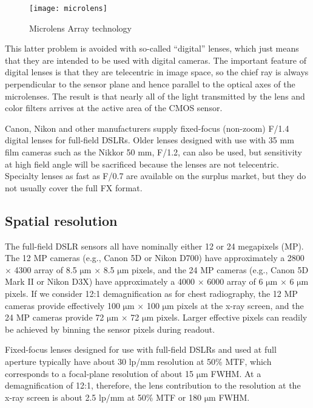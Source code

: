 \begin{figure}[h]
\centering
\texttt{[image: microlens]}
\caption{Microlens Array technology~\citep{microlensfig}}
\label{fig:microlensarray}
\end{figure}

This latter problem is avoided with so-called ``digital'' lenses, which just means that they are intended to be used with digital cameras. The important feature of digital lenses is that they are telecentric in image space, so the chief ray is always perpendicular to the sensor plane and hence parallel to the optical axes of the microlenses. The result is that nearly all of the light transmitted by the lens and color filters arrives at the active area of the CMOS sensor. 

Canon, Nikon and other manufacturers supply fixed-focus (non-zoom) F/1.4 digital lenses for full-field DSLRs. Older lenses designed with use with 35 mm film cameras such as the Nikkor 50 mm, F/1.2, can also be used, but sensitivity at high field angle will be sacrificed because the lenses are not telecentric. Specialty lenses as fast as F/0.7 are available on the surplus market, but they do not usually cover the full FX format.

\subsection{Spatial resolution}
\label{subsect:spatial_resolution}
The full-field DSLR sensors all have nominally either 12 or 24 megapixels (MP). The 12 MP cameras (e.g., Canon 5D or Nikon D700) have approximately a 2800 $\times$ 4300 array of 8.5 $\mathrm{\mu m}$ $\times$ 8.5 $\mathrm{\mu m}$ pixels, and the 24 MP cameras (e.g., Canon 5D Mark II or Nikon D3X) have approximately a 4000 $\times$ 6000 array of 6 $\mathrm{\mu m}$ $\times$ 6 $\mathrm{\mu m}$ pixels. If we consider 12:1 demagnification as for chest radiography, the 12 MP cameras provide effectively 100 $\mathrm{\mu m}$ $\times$ 100 $\mathrm{\mu m}$ pixels at the x-ray screen, and the 24 MP cameras provide 72 $\mathrm{\mu m}$ $\times$ 72 $\mathrm{\mu m}$ pixels. Larger effective pixels can readily be achieved by binning the sensor pixels during readout.

Fixed-focus lenses designed for use with full-field DSLRs and used at full aperture typically have about 30 lp/mm resolution at 50\% MTF, which corresponds to a focal-plane resolution of about 15 $\mathrm{\mu m}$ FWHM. At a demagnification of 12:1, therefore, the lens contribution to the resolution at the x-ray screen is about 2.5 lp/mm at 50\% MTF or 180 $\mathrm{\mu m}$ FWHM.

